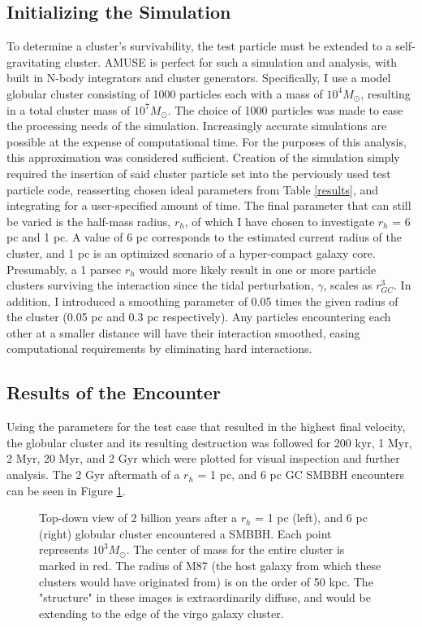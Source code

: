 \documentclass{aastex62}
\begin{document}
\subsection{Initializing the Simulation}
To determine a cluster's survivability, the test particle must be extended to a self-gravitating cluster. AMUSE is perfect for such a simulation and analysis, with built in N-body integrators and cluster generators. Specifically, I use a \citet{plum11} model globular cluster consisting of 1000 particles each with a mass of $10^4 M_{\odot}$, resulting in a total cluster mass of $10^7 M_{\odot}$. The choice of 1000 particles was made to ease the processing needs of the simulation. Increasingly accurate simulations are possible at the expense of computational time. For the purposes of this analysis, this approximation was considered sufficient. Creation of the simulation simply required the insertion of said cluster particle set into the perviously used test particle code, reasserting chosen ideal parameters from Table \ref{results}, and integrating for a user-specified amount of time. The final parameter that can still be varied is the half-mass radius, $r_{h}$, of which I have chosen to investigate  $r_{h}$ = 6 pc and 1 pc. A value of 6 pc corresponds to the estimated current radius of the cluster, and 1 pc is an optimized scenario of a hyper-compact galaxy core. Presumably, a 1 parsec  $r_{h}$ would more likely result in one or more particle clusters surviving the interaction since the tidal perturbation, $\gamma$, scales as $r_{GC}^3$. In addition, I introduced a smoothing parameter of 0.05 times the given radius of the cluster (0.05 pc and 0.3 pc respectively). Any particles encountering each other at a smaller distance will have their interaction smoothed, easing computational requirements by eliminating hard interactions. 
\subsection{Results of the Encounter}
Using the parameters for the test case that resulted in the highest final velocity, the globular cluster and its resulting destruction was followed for 200 kyr, 1 Myr, 2 Myr, 20 Myr, and 2 Gyr which were plotted for visual inspection and further analysis. The 2 Gyr aftermath of a $r_{h}$ = 1 pc, and 6 pc GC SMBBH encounters can be seen in Figure \ref{fig5}. 

\begin{figure}
\centering
\caption{Top-down view of 2 billion years after a $r_{h}$ = 1 pc (left), and 6 pc (right) globular cluster encountered a SMBBH. Each point represents $10^3 M_{\odot}$. The center of mass for the entire cluster is marked in red. The radius of M87 (the host galaxy from which these clusters would have originated from) is on the order of 50 kpc. The "structure" in these images is extraordinarily diffuse, and would be extending to the edge of the virgo galaxy cluster.\label{fig5}}
\end{figure}
\end{document}
